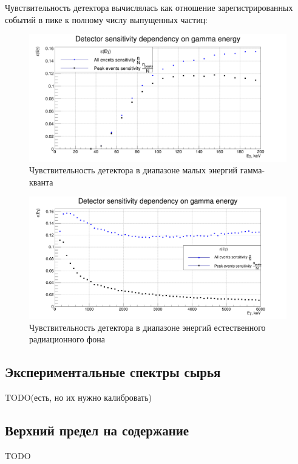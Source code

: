 \documentclass[a4paper,article,14pt]{extarticle}
\begin{document}
Чувствительность детектора вычислялась как отношение зарегистрированных событий в пике к полному числу выпущенных частиц:

\begin{figure}
    \centering
    \includegraphics[width =\textwidth]{images/epsilon0-200.png}
    \caption{Чувствительность детектора в диапазоне малых энергий гамма-кванта}
    \label{fig:my_label}
\end{figure}

\begin{figure}
    \centering
    \includegraphics[width =\textwidth]{images/epsilon0-6000.png}
    \caption{Чувствительность детектора в диапазоне энергий естественного радиационного фона}
    \label{fig:my_label}
\end{figure}

\subsection{Экспериментальные спектры сырья}
    
    TODO(есть, но их нужно калибровать)
    
\subsection{Верхний предел на содержание}
     TODO
\end{document}
